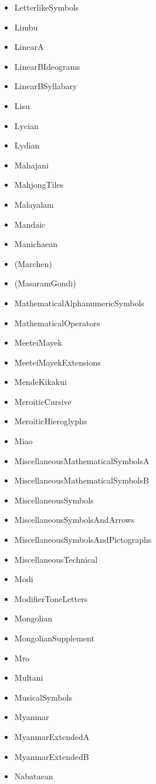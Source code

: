 \documentclass{article}
\newenvironment{itemlist}{%
  \begin{itemize}
	\setlength{\itemsep}{0pt}
	\setlength{\parsep}{0pt}
	\setlength{\topsep}{0pt}
	\setlength{\partopsep}{0pt}
	\setlength{\parskip}{0pt}
	\setlength{\labelsep}{5pt}}%
{
  \end{itemize}}
\begin{document}
\begin{multicols*}{2}
\begin{itemlist}
				\item LetterlikeSymbols
				\item Limbu
				\item LinearA
				\item LinearBIdeograms
				\item LinearBSyllabary
				\item Lisu
				\item Lycian
				\item Lydian
				\item Mahajani
				\item MahjongTiles
				\item Malayalam
				\item Mandaic
				\item Manichaean
				\item (Marchen)
				\item (MasaramGondi)
				\item MathematicalAlphanumericSymbols
				\item MathematicalOperators
				\item MeeteiMayek
				\item MeeteiMayekExtensions
				\item MendeKikakui
				\item MeroiticCursive
				\item MeroiticHieroglyphs
				\item Miao
				\item MiscellaneousMathematicalSymbolsA
				\item MiscellaneousMathematicalSymbolsB
				\item MiscellaneousSymbols
				\item MiscellaneousSymbolsAndArrows
				\item MiscellaneousSymbolsAndPictographs
				\item MiscellaneousTechnical
				\item Modi
				\item ModifierToneLetters
				\item Mongolian
				\item MongolianSupplement
				\item Mro
				\item Multani
				\item MusicalSymbols
				\item Myanmar
				\item MyanmarExtendedA
				\item MyanmarExtendedB
				\item Nabataean

\end{itemlist}
\end{multicols*}
\end{document}
